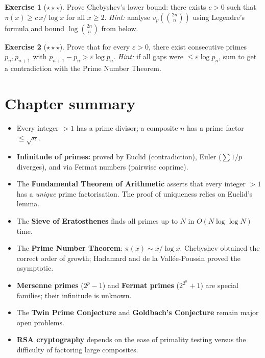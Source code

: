 \documentclass[12pt,a4paper,openany]{book}
\theoremstyle{definition}
\newtheorem{exercise}{Exercise}[chapter]
\theoremstyle{plain}
\theoremstyle{remark}
\begin{document}
\begin{exercise}[$\star\star\star$]
\label{exer:ch2-chebyshev-lower}
Prove Chebyshev's lower bound: there exists $c > 0$ such that
$\pi(x) \ge c\, x / \log x$ for all $x \ge 2$.
\textit{Hint:} analyse $v_p(\binom{2n}{n})$ using Legendre's formula and bound
$\log\binom{2n}{n}$ from below.
\end{exercise}

\begin{exercise}[$\star\star\star$]
\label{exer:ch2-prime-gaps}
Prove that for every $\varepsilon > 0$, there exist consecutive primes
$p_n, p_{n+1}$ with $p_{n+1} - p_n > \varepsilon \log p_n$.
\textit{Hint:} if all gaps were $\le \varepsilon \log p_n$, sum to get a
contradiction with the Prime Number Theorem.
\end{exercise}

\section*{Chapter summary}

\begin{itemize}[nosep]
  \item Every integer $> 1$ has a prime divisor; a composite $n$ has a prime
        factor $\le \sqrt{n}$.
  \item \textbf{Infinitude of primes:} proved by Euclid (contradiction),
        Euler ($\sum 1/p$ diverges), and via Fermat numbers (pairwise coprime).
  \item The \textbf{Fundamental Theorem of Arithmetic} asserts that every
        integer $> 1$ has a \emph{unique} prime factorisation. The proof
        of uniqueness relies on Euclid's lemma.
  \item The \textbf{Sieve of Eratosthenes} finds all primes up to $N$ in
        $O(N \log\log N)$ time.
  \item The \textbf{Prime Number Theorem}: $\pi(x) \sim x/\log x$. Chebyshev
        obtained the correct order of growth; Hadamard and de la Vall\'{e}e-Poussin
        proved the asymptotic.
  \item \textbf{Mersenne primes} ($2^p - 1$) and \textbf{Fermat primes}
        ($2^{2^n}+1$) are special families; their infinitude is unknown.
  \item The \textbf{Twin Prime Conjecture} and \textbf{Goldbach's Conjecture}
        remain major open problems.
  \item \textbf{RSA cryptography} depends on the ease of primality testing
        versus the difficulty of factoring large composites.
\end{itemize}
\end{document}
